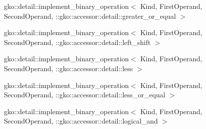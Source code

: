 \begin{DoxyCompactList}
\item gko\+:\+:detail\+:\+:implement\+\_\+binary\+\_\+operation$<$ Kind, First\+Operand, Second\+Operand, \+:\+:gko\+:\+:accessor\+:\+:detail\+:\+:greater\+\_\+or\+\_\+equal $>$\begin{DoxyCompactList}
\item {}
\end{DoxyCompactList}
\item gko\+:\+:detail\+:\+:implement\+\_\+binary\+\_\+operation$<$ Kind, First\+Operand, Second\+Operand, \+:\+:gko\+:\+:accessor\+:\+:detail\+:\+:left\+\_\+shift $>$\begin{DoxyCompactList}
\item {}
\end{DoxyCompactList}
\item gko\+:\+:detail\+:\+:implement\+\_\+binary\+\_\+operation$<$ Kind, First\+Operand, Second\+Operand, \+:\+:gko\+:\+:accessor\+:\+:detail\+:\+:less $>$\begin{DoxyCompactList}
\item {}
\end{DoxyCompactList}
\item gko\+:\+:detail\+:\+:implement\+\_\+binary\+\_\+operation$<$ Kind, First\+Operand, Second\+Operand, \+:\+:gko\+:\+:accessor\+:\+:detail\+:\+:less\+\_\+or\+\_\+equal $>$\begin{DoxyCompactList}
\item {}
\end{DoxyCompactList}
\item gko\+:\+:detail\+:\+:implement\+\_\+binary\+\_\+operation$<$ Kind, First\+Operand, Second\+Operand, \+:\+:gko\+:\+:accessor\+:\+:detail\+:\+:logical\+\_\+and $>$\begin{DoxyCompactList}
\item {}

\end{DoxyCompactList}
\end{DoxyCompactList}

